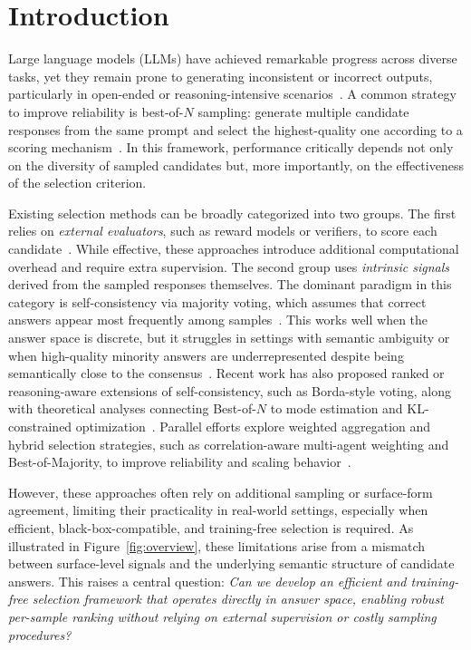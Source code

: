 \section{Introduction}

Large language models (LLMs) have achieved remarkable progress across diverse tasks, yet they remain prone to generating inconsistent or incorrect outputs, particularly in open-ended or reasoning-intensive scenarios~\citep{wang2022self, huang2025survey}. 
A common strategy to improve reliability is best-of-$N$ sampling: generate multiple candidate responses from the same prompt and select the highest-quality one according to a scoring mechanism~\citep{cobbe2021training, wang-etal-2024-math, kang2025scalable}. 
In this framework, performance critically depends not only on the diversity of sampled candidates but, more importantly, on the effectiveness of the selection criterion.

Existing selection methods can be broadly categorized into two groups. The first relies on \emph{external evaluators}, such as reward models or verifiers, to score each candidate~\citep{cobbe2021training, lightman2023let}. 
While effective, these approaches introduce additional computational overhead and require extra supervision. 
The second group uses \emph{intrinsic signals} derived from the sampled responses themselves. 
The dominant paradigm in this category is self-consistency via majority voting, which assumes that correct answers appear most frequently among samples~\citep{wang2022self}. 
This works well when the answer space is discrete, but it struggles in settings with semantic ambiguity or when high-quality minority answers are underrepresented despite being semantically close to the consensus~\citep{chen2023universal, kang2025scalable}.
Recent work has also proposed ranked or reasoning-aware extensions of self-consistency, such as Borda-style voting, along with theoretical analyses connecting Best-of-$N$ to mode estimation and KL-constrained optimization~\citep{gui2024bonbon, wang2025ranked, wan2025reasoning, cordero2025certified}. 
Parallel efforts explore weighted aggregation and hybrid selection strategies, such as correlation-aware multi-agent weighting and Best-of-Majority, to improve reliability and scaling behavior~\citep{ai2025beyond, di2025best}.

However, these approaches often rely on additional sampling or surface-form agreement, limiting their practicality in real-world settings, especially when efficient, black-box-compatible, and training-free selection is required. 
As illustrated in Figure~\ref{fig:overview}, these limitations arise from a mismatch between surface-level signals and the underlying semantic structure of candidate answers.
This raises a central question: \emph{Can we develop an efficient and training-free selection framework that operates directly in answer space, enabling robust per-sample ranking without relying on external supervision or costly sampling procedures?}

